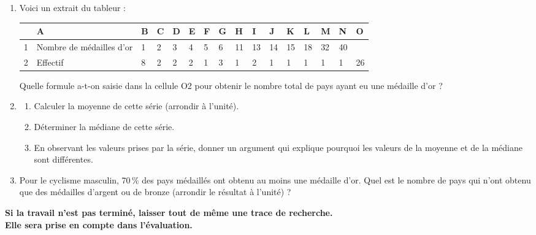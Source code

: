 \documentclass[10pt]{article}
\begin{document}
\bigskip
 
\begin{enumerate}
\item Voici un extrait du tableur :

\medskip

\begin{tabularx}{\linewidth}{|c|m{1.5cm}|*{14}{X|}}\hline
 &A									&B	&C	&D	&E	&F	&G	&H	&I	&J	&K	&L	&M	&N	&O\\ \hline 
1&\footnotesize Nombre de médailles d'or	&1	&2	&3	&4	&5	&6	&11	&13&14&15&18&32&40&\\ \hline 
2&\footnotesize Effectif					&8 	&2 	&2	&2	&1	&3	&1	&2&1&1&1&1&1&26\\ \hline
\end{tabularx}

\medskip

Quelle formule a-t-on saisie dans la cellule O2 pour obtenir le nombre total de pays ayant eu une médaille d'or ? 
\item 	
	\begin{enumerate}
		\item Calculer la moyenne de cette série (arrondir à l'unité). 
		\item Déterminer la médiane de cette série. 
		\item En observant les valeurs prises par la série, donner un argument qui explique pourquoi les	valeurs de	la moyenne et de la	médiane sont différentes.
	\end{enumerate}
\item Pour le cyclisme masculin, 70\,\% des pays médaillés ont obtenu au moins une médaille d'or. Quel est le nombre de	pays qui n'ont obtenu que des médailles d'argent ou de bronze (arrondir le résultat à l'unité) ? 
\end{enumerate}

\textbf{Si la travail n'est pas terminé, laisser tout de même une trace de recherche.\\  
Elle sera prise en compte dans l'évaluation.}
\end{document}
